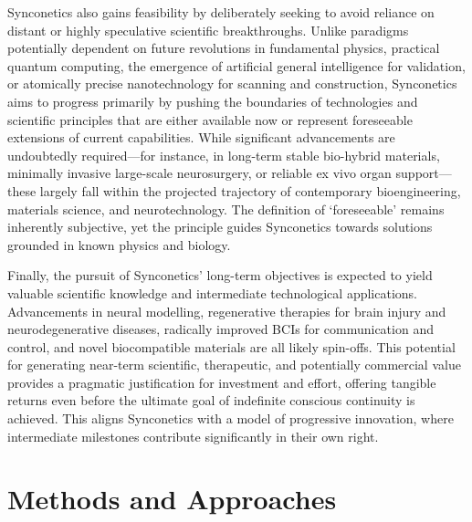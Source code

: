 \documentclass[10pt]{article}
\begin{document}
\begin{sloppypar}
  Synconetics also gains feasibility by deliberately seeking to avoid reliance on distant or highly speculative scientific breakthroughs. Unlike paradigms potentially dependent on future revolutions in fundamental physics, practical quantum computing, the emergence of artificial general intelligence for validation, or atomically precise nanotechnology for scanning and construction, Synconetics aims to progress primarily by pushing the boundaries of technologies and scientific principles that are either available now or represent foreseeable extensions of current capabilities. While significant advancements are undoubtedly required—for instance, in long-term stable bio-hybrid materials, minimally invasive large-scale neurosurgery, or reliable ex vivo organ support—these largely fall within the projected trajectory of contemporary bioengineering, materials science, and neurotechnology. The definition of ‘foreseeable’ remains inherently subjective, yet the principle guides Synconetics towards solutions grounded in known physics and biology.

  Finally, the pursuit of Synconetics’ long-term objectives is expected to yield valuable scientific knowledge and intermediate technological applications. Advancements in neural modelling, regenerative therapies for brain injury and neurodegenerative diseases, radically improved BCIs for communication and control, and novel biocompatible materials are all likely spin-offs. This potential for generating near-term scientific, therapeutic, and potentially commercial value provides a pragmatic justification for investment and effort, offering tangible returns even before the ultimate goal of indefinite conscious continuity is achieved. This aligns Synconetics with a model of progressive innovation, where intermediate milestones contribute significantly in their own right.

  \section{Methods and Approaches}
  \label{sec:methods}


\end{sloppypar}
\end{document}
